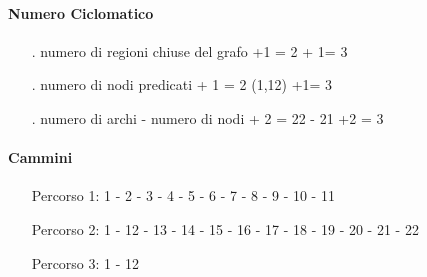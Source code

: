 \paragraph{Numero Ciclomatico}
\begin{itemize}
\item[.] numero di regioni chiuse del grafo +1 = 2 + 1= 3 
\item[.] numero di nodi predicati + 1 = 2 (1,12) +1= 3
\item[.] numero di archi - numero di nodi + 2 = 22 - 21 +2 = 3
\end{itemize}
\paragraph{Cammini}
\begin{itemize}
\item[Percorso 1:] 1 - 2 - 3 - 4 - 5 - 6 - 7 - 8 - 9 - 10 - 11
\item[Percorso 2:] 1 - 12 - 13 - 14 - 15 - 16 - 17 - 18 - 19 - 20 - 21 - 22
\item[Percorso 3:] 1 - 12
\end{itemize}
